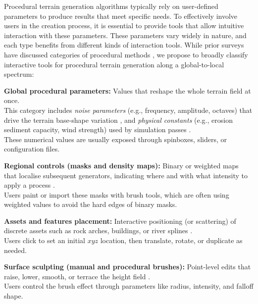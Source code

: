 Procedural terrain generation algorithms typically rely on user-defined parameters to produce results that meet specific needs. To effectively involve users in the creation process, it is essential to provide tools that allow intuitive interaction with these parameters. These parameters vary widely in nature, and each type benefits from different kinds of interaction tools. While prior surveys have discussed categories of procedural methods \cite{Smelik2009,Smelik2014,Galin2019}, we propose to broadly classify interactive tools for procedural terrain generation along a global-to-local spectrum: 
\begin{Itemize}
    \Item{} \textbf{Global procedural parameters:} Values that reshape the whole terrain field at once. \\
    This category includes \emph{noise parameters} (e.g., frequency, amplitude, octaves) that drive the terrain base-shape variation \cite{Perlin1985,Fournier1982}, and  \emph{physical constants} (e.g., erosion sediment capacity, wind strength) used by simulation passes \cite{Benes2001a,Paris2019b}. \\
        These numerical values are usually exposed through spinboxes, sliders, or configuration files.

    \Item{} \textbf{Regional controls (masks and density maps):} Binary or weighted maps that localise subsequent generators, indicating where and with what intensity to apply a process \cite{DeCarpentier2009,Stachniak2005}. \\
    Users paint or import these masks with brush tools, which are often using weighted values to avoid the hard edges of binary masks.

    \Item{} \textbf{Assets and features placement:} Interactive positioning (or scattering) of discrete assets such as rock arches, buildings, or river splines \cite{Becher2017,Grosbellet2016}. \\  
    Users click to set an initial $xyz$ location, then translate, rotate, or duplicate as needed.

    \Item{} \textbf{Surface sculpting (manual and procedural brushes):} Point-level edits that raise, lower, smooth, or terrace the height field \cite{Galyean1991,Gain2005,Chen2021}. \\
    Users control the brush effect through parameters like radius, intensity, and falloff shape.
\end{Itemize}

